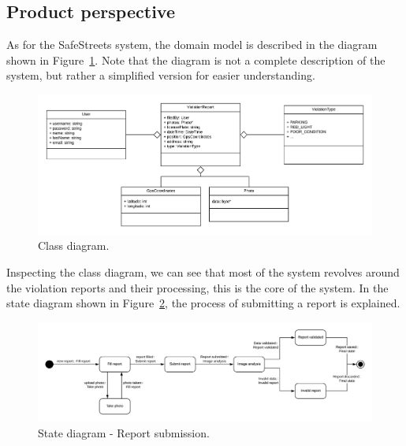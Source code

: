 
\subsection{Product perspective}

As for the SafeStreets system, the domain model is described in the diagram shown in Figure~\ref{fig:class-general}. Note that the diagram is not a complete description of the system, but rather a simplified version for easier understanding.

\begin{figure}[!h]
\centering
\includegraphics[width=\textwidth]{Images/class-general.png}
\caption{\label{fig:class-general}Class diagram.}
\end{figure}

Inspecting the class diagram, we can see that most of the system revolves around the violation reports and their processing, this is the core of the system.
In the state diagram shown in Figure~\ref{fig:state-report-submission}, the process of submitting a report is explained.

\begin{figure}[!h]
\centering
\includegraphics[width=\textwidth]{Images/state-report-submission.png}
\caption{\label{fig:state-report-submission}State diagram - Report submission.}
\end{figure}

